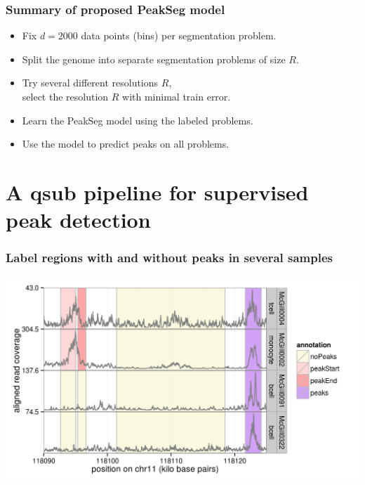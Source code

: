 \documentclass{beamer}
\begin{document}
\begin{frame}
  \frametitle{Summary of proposed PeakSeg model}
  \begin{itemize}
  \item Fix $d = 2000$ data points (bins) per segmentation problem.
  \item Split the genome into separate segmentation problems of size
    $R$.
  \item Try several different resolutions $R$,\\
    select the resolution $R$ with minimal train error.
  \item Learn the PeakSeg model using the labeled problems.
  \item Use the model to predict peaks on all problems.
  \end{itemize}
\end{frame}

\section{A qsub pipeline for supervised peak detection}

\begin{frame}
  \frametitle{Label regions with and without peaks in several samples}
  \includegraphics[width=\textwidth]{figure-4samples-just-regions}

\end{frame}
\end{document}
